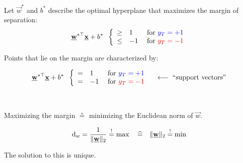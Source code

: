 \begin{frame}\frametitle{\subsecname}
\begin{minipage}{6cm}
Let $\vec w^{*}$ and $b^{*}$ describe the optimal hyperplane that maximizes the margin of separation:
    \begin{equation}
    \vec w^{*\top} \vec x + b^{*} \;\;
    \left \{ \begin{array}{lll}
					\ge& 1 \;&\text{for } {\color{blue}y_{T} = +1}\\
					\le& -1 \;&\text{for } {\color{red}y_{T} = -1}
				\end{array} \right.  
    \end{equation}
    
    Points that lie on the margin are characterized by:
    
    \slidesonly{\vspace{-3mm}}
    
    \begin{equation}
    \vec w^{*\top} \vec x + b^{*} \;\;
    \left \{ \begin{array}{lll}
					=& 1 \;&\text{for } {\color{blue}y_{T} = +1}\\
					=& -1 \;&\text{for } {\color{red}y_{T} = -1}
				\end{array} \right.
			\quad \longleftarrow\; \text{``support vectors''} 
    \end{equation}
    
       

\end{minipage}\\
  
    
    \svspace{3mm}
    
    Maximizing the margin $\corresponds$ minimizing the Euclidean norm of $\vec w$.
    
    
    \begin{equation}
    \mathrm{d}_{w} = \frac{1}{\lVert \vec w \rVert_2} \eqexcl \max 
    \quad \corresponds \quad 
    \lVert \vec w \rVert_2 \eqexcl \min
    \end{equation}
    
    
    The solution to this is unique.

\end{frame}

